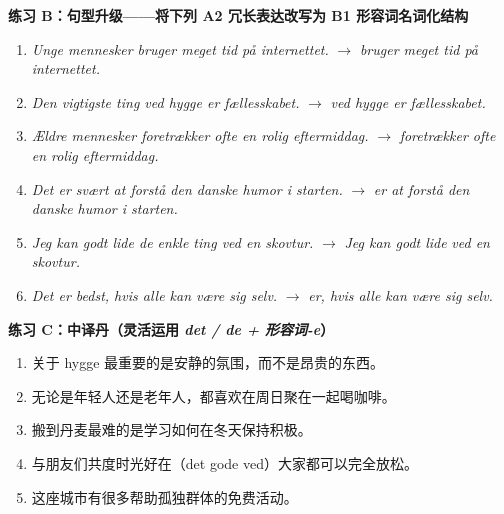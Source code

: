 \textbf{练习 B：句型升级——将下列 A2 冗长表达改写为 B1 形容词名词化结构}
\begin{enumerate}
  \item \textit{Unge mennesker bruger meget tid på internettet.} $\rightarrow$ \underline{\hspace{2.0cm}} \textit{bruger meget tid på internettet.}
  \item \textit{Den vigtigste ting ved hygge er fællesskabet.} $\rightarrow$ \underline{\hspace{2.4cm}} \textit{ved hygge er fællesskabet.}
  \item \textit{Ældre mennesker foretrækker ofte en rolig eftermiddag.} $\rightarrow$ \underline{\hspace{2.0cm}} \textit{foretrækker ofte en rolig eftermiddag.}
  \item \textit{Det er svært at forstå den danske humor i starten.} $\rightarrow$ \underline{\hspace{2.2cm}} \textit{er at forstå den danske humor i starten.}
  \item \textit{Jeg kan godt lide de enkle ting ved en skovtur.} $\rightarrow$ \textit{Jeg kan godt lide} \underline{\hspace{2.2cm}} \textit{ved en skovtur.}
  \item \textit{Det er bedst, hvis alle kan være sig selv.} $\rightarrow$ \underline{\hspace{2.2cm}} \textit{er, hvis alle kan være sig selv.}
\end{enumerate}

\textbf{练习 C：中译丹（灵活运用 \textit{det / de + 形容词-e}）}
\begin{enumerate}
  \item 关于 hygge 最重要的是安静的氛围，而不是昂贵的东西。
  \item 无论是年轻人还是老年人，都喜欢在周日聚在一起喝咖啡。
  \item 搬到丹麦最难的是学习如何在冬天保持积极。
  \item 与朋友们共度时光好在（det gode ved）大家都可以完全放松。
  \item 这座城市有很多帮助孤独群体的免费活动。
\end{enumerate}


